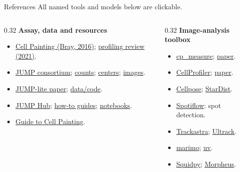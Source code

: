 \documentclass[aspectratio=169,10pt]{beamer}
\begin{document}
\begin{frame}[label={sec:org0000017}]{References}
{\footnotesize All named tools and models below are clickable.}
\medskip
\begin{columns}[T,onlytextwidth]
\begin{column}{0.32\textwidth}
\footnotesize
\textbf{Assay, data and resources}
\begin{itemize}
\item \href{https://doi.org/10.1038/nprot.2016.105}{Cell Painting (Bray, 2016)}; \href{https://doi.org/10.1038/s41573-020-00117-w}{profiling review (2021)}.
\item \href{https://jump-cellpainting.broadinstitute.org/}{JUMP consortium}; \href{https://github.com/jump-cellpainting/datasets/tree/016e865fa0691244e0860943e41c7d6a88ed2580/metadata}{counts}; \href{https://github.com/broadinstitute/jump_hub/blob/e742f5aa37472eb17f326ba8315d22b27e58f330/explanations/data_description.md}{centers}; \href{https://github.com/jump-cellpainting/datasets/blob/016e865fa0691244e0860943e41c7d6a88ed2580/stats/cpg0016_source_images_tiff_count.csv}{images}.
\item \href{https://arxiv.org/abs/2608.07632v3}{JUMP-lite paper}; \href{https://github.com/afermg/JUMP_lite}{data/code}.
\item \href{https://broadinstitute.github.io/jump_hub/}{JUMP Hub}; \href{https://broadinstitute.github.io/jump_hub/howto/interactive/1_jumprr_steps.html}{how-to guides}; \href{https://broadinstitute.github.io/jump_hub/howto/notebooks/0_overview.html}{notebooks}.
\item \href{https://ciminilab.github.io/GuideToCellPainting/}{Guide to Cell Painting}.
\end{itemize}
\end{column}
\begin{column}{0.32\textwidth}
\footnotesize
\textbf{Image-analysis toolbox}
\begin{itemize}
\item \href{https://github.com/afermg/cp_measure}{cp\_measure}; \href{https://arxiv.org/abs/2507.01163v1}{paper}.
\item \href{https://cellprofiler.org/}{CellProfiler}; \href{https://doi.org/10.1186/gb-2006-7-10-r100}{paper}.
\item \href{https://github.com/MouseLand/cellpose}{Cellpose}; \href{https://github.com/stardist/stardist}{StarDist}.
\item \href{https://github.com/weigertlab/spotiflow}{Spotiflow}: spot detection.
\item \href{https://github.com/weigertlab/trackastra}{Trackastra}; \href{https://github.com/royerlab/ultrack}{Ultrack}.
\item \href{https://marimo.io/}{marimo}; \href{https://docs.astral.sh/uv/}{uv}.
\item \href{https://squidpy.readthedocs.io/}{Squidpy}; \href{https://github.com/cmap/morpheus.js}{Morpheus}.
\end{itemize}
\end{column}
\end{columns}
\end{frame}
\end{document}

